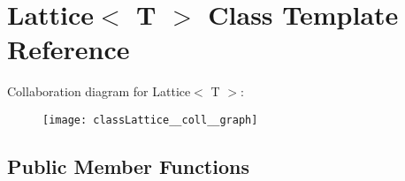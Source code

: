 \hypertarget{classLattice}{}\section{Lattice$<$ T $>$ Class Template Reference}
\label{classLattice}


Collaboration diagram for Lattice$<$ T $>$\+:\nopagebreak
\begin{figure}[H]
\begin{center}
\leavevmode
\texttt{[image: classLattice\_\_coll\_\_graph]}
\end{center}
\end{figure}
\subsection*{Public Member Functions}
